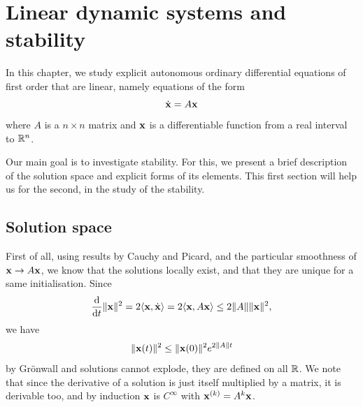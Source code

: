 \chapter{Linear dynamic systems and stability}
In this chapter, we study explicit autonomous ordinary differential equations of first order that are linear, namely equations of the form 
\[\dot{\mathbf{x}}=A\mathbf{x}\]
where $A$ is a $n\times n$ matrix and $\mathbf{x}$ is a differentiable function from a real interval to $\mathbb{R}^n$.

Our main goal is to investigate stability. For this, we present a brief description of the solution space and explicit forms of its elements. This first section will help us for the second, in the study of the stability.
\section{Solution space}
First of all, using results by Cauchy and Picard, and the particular smoothness of $\mathbf{x}\to A\mathbf{x}$, we know that the solutions locally exist, and that they are unique for a same initialisation. Since $$\frac{\mathrm{d}}{\mathrm{d} t}\|\mathbf{x}\|^2=2\langle\mathbf{x},\dot{\mathbf{x}}\rangle=2\langle\mathbf{x},A\mathbf{x}\rangle\leq 2\|A\|\|\mathbf{x}\|^2,$$ 
we have
$$\|\mathbf{x}(t)\|^2\leq \|\mathbf{x}(0)\|^2e^{2\|A\|t} $$
by Grönwall and solutions cannot explode, they are defined on all $\mathbb{R}$. We note that since the derivative of a solution is just itself multiplied by a matrix, it is derivable too, and by induction $\mathbf{x}$ is $C^\infty$ with $\mathbf{x}^{(k)}=A^k\mathbf{x}$. 

